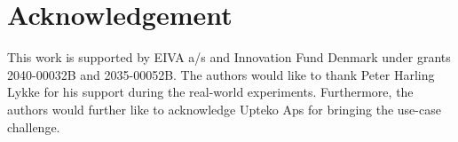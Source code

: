 \section{Acknowledgement}
{
This work is supported by EIVA a/s and Innovation Fund Denmark under grants 2040-00032B and 2035-00052B. The authors would like to thank Peter Harling Lykke for his support during the real-world experiments. Furthermore, the authors would further like to acknowledge Upteko Aps for bringing the use-case challenge.
}


















